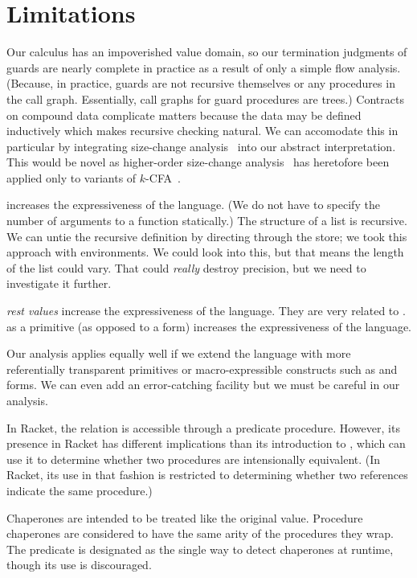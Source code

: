 \section{Limitations}

Our calculus has an impoverished value domain, so our termination judgments of guards are nearly complete in practice as a result of only a simple flow analysis.
(Because, in practice, guards are not recursive themselves or any procedures in the call graph. Essentially, call graphs for guard procedures are trees.)
Contracts on compound data complicate matters because the data may be defined inductively which makes recursive checking natural.
We can accomodate this in particular by integrating size-change analysis~\cite{lee2001size} into our abstract interpretation.
This would be novel as higher-order size-change analysis~\cite{sereni2007termination} has heretofore been applied only to variants of $k$-CFA~\cite{shivers1991control}.

 increases the expressiveness of the language.
(We do not have to specify the number of arguments to a function statically.)
The structure of a list is recursive.
We can untie the recursive definition by directing through the store; we took this approach with environments.
We could look into this, but that means the length of the list could vary.
That could \emph{really} destroy precision, but we need to investigate it further.

\emph{rest values} increase the expressiveness of the language. They are very related to .
 as a primitive (as opposed to a form) increases the expressiveness of the language.

Our analysis applies equally well if we extend the language with more referentially transparent primitives or macro-expressible constructs such as  and  forms.
We can even add an error-catching facility but we must be careful in our analysis.

In Racket, the  relation is accessible through a predicate procedure.
However, its presence in Racket has different implications than its introduction to \chapcalc, which can use it to determine whether two procedures are intensionally equivalent.
(In Racket, its use in that fashion is restricted to determining whether two references indicate the same procedure.)

Chaperones are intended to be treated like the original value.
Procedure chaperones are considered to have the same arity of the procedures they wrap.
The  predicate is designated as the single way to detect chaperones at runtime, though its use is discouraged.

